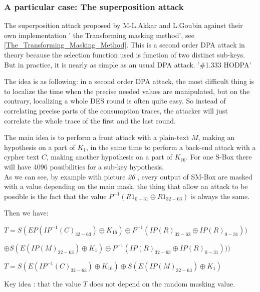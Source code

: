 \subsubsection{A particular case: The superposition attack}
\label{The_superposition_attack}

The superposition attack proposed by M-L.Akkar and L.Goubin against their own implementation 
' the Transforming masking method', see \ref{The_Transforming_Masking_Method}.
This is a second order DPA attack in theory because the selection function used is function of two distinct 
sub-keys. But in practice, it is nearly as simple as an usual DPA attack. '\#1.333 HODPA'
\vspace{3mm}
 
The idea is as following: in a second order DPA attack, the most
difficult thing is to localize the time when the precise needed values are manipulated,
but on the contrary, localizing a whole DES round is often quite easy.
So instead of correlating precise parts of the consumption traces, the attacker
will just correlate the whole trace of the first and the last round.
\vspace{3mm}

The main idea is to perform a front attack with a plain-text $M$, making an hypothesis
on a part of $K_1$, in the same time to perform a back-end attack with a cypher text $C$,
making another hypothesis on a part of $K_16$.
For one S-Box there will have 4096 possibilities for a sub-key hypothesis.\\
As we can see, by example with picture \textit{26} , every output of SM-Box are masked 
with a value depending on the main mask,
the thing that allow an attack to be possible is the fact that the value
$P^{-1}( R1_{0-31}\oplus R1_{32-63})$ is always the same.

Then  we have:
\begin{center}
$T =    S(EP(IP^{-1}(C)_{32-63}) \oplus K_{16}) \oplus P^{-1}(IP(R)_{32-63} \oplus IP(R)_{0-31})) $

$\oplus S(E(IP(M)_{32-63}) \oplus K_1) \oplus P^{-1}(IP(R)_{32-63} \oplus IP(R)_{0-31})))$\\  
\end{center}
\begin{center}
$T = S(E(IP^{-1}(C)_{32-63}) \oplus K_{16}) \oplus S(E(IP(M)_{32-63}) \oplus K_1)$
\end{center}

Key idea : that the value $T$ does not depend on the random masking value.

